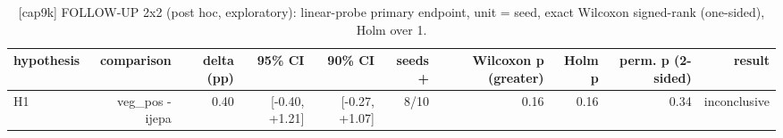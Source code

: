 \begin{table}[t]
\centering
\small
\caption{[cap9k] FOLLOW-UP 2x2 (post hoc, exploratory): linear-probe primary endpoint, unit = seed, exact Wilcoxon signed-rank (one-sided), Holm over 1.}
\label{tab:primary_comparisons}
\begin{tabular}{lrrrrrrrrr}
\toprule
hypothesis & comparison & delta (pp) & 95\% CI & 90\% CI & seeds + & Wilcoxon p (greater) & Holm p & perm. p (2-sided) & result \\
\midrule
H1 & veg\_pos - ijepa & 0.40 & [-0.40, +1.21] & [-0.27, +1.07] & 8/10 & 0.16 & 0.16 & 0.34 & inconclusive \\
\bottomrule
\end{tabular}
\end{table}
